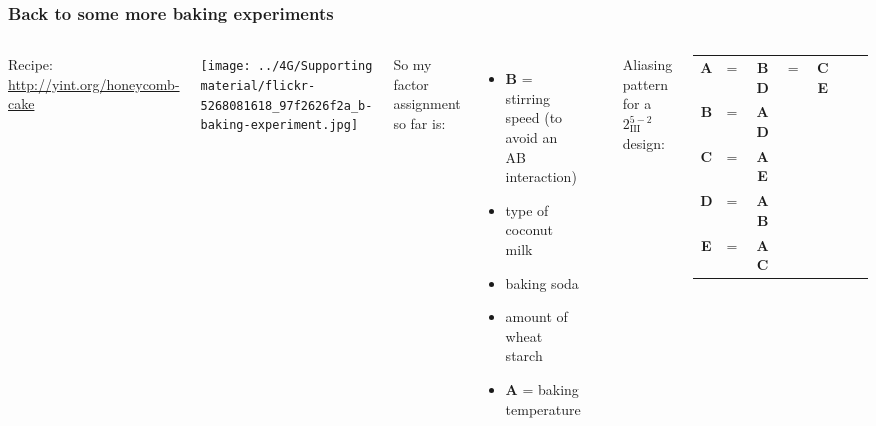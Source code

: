 \begin{frame}\frametitle{Back to some more baking experiments}
	\begin{columns}[T]
		
			\vspace{1cm}
			{\small Recipe: \href{http://yint.org/honeycomb-cake}{http://yint.org/honeycomb-cake}}
		
			\vspace{1cm}
		
			\centerline{\texttt{[image: ../4G/Supporting material/flickr-5268081618\_97f2626f2a\_b-baking-experiment.jpg]}}
			
		
			{\color{myOrange}So my factor assignment so far is:}
			\begin{itemize}
				\item	\textbf{B} = stirring speed {\tiny (to avoid an AB interaction)}
				\item	type of coconut milk
				\item	baking soda
				\item	amount of wheat starch
				\item	\textbf{A} = baking temperature
			\end{itemize}
			
			\vspace{0.4cm}
			\hrule
			
			\vspace{0.1cm}
			Aliasing pattern for a $2^{5-2}_{\textrm{III}}$ design:
			\begin{tabulary}{\linewidth}{ccccccc}				
				\textbf{A} & = & \textbf{BD} & = & \textbf{CE}  \\
				\textbf{B} & = & \textbf{AD} &  & \\
				\textbf{C} & = & \textbf{AE} &  & \\
				\textbf{D} & = & \textbf{AB} &  & \\
				\textbf{E} & = & \textbf{AC} &  & 
			\end{tabulary}
			
	\end{columns}
	
	\vspace{1cm}

	
\end{frame}


